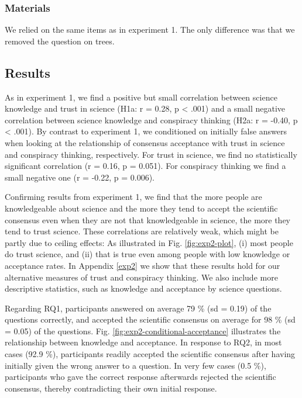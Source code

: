 \documentclass[
  doc,floatsintext]{apa6}
\begin{document}
\subsubsection{Materials}\label{materials-1}

We relied on the same items as in experiment 1. The only difference was that we removed the question on trees.

\subsection{Results}\label{results-1}

As in experiment 1, we find a positive but small correlation between science knowledge and trust in science (H1a: r = 0.28, p \textless{} .001) and a small negative correlation between science knowledge and conspiracy thinking (H2a: r = -0.40, p \textless{} .001). By contrast to experiment 1, we conditioned on initially false answers when looking at the relationship of consensus acceptance with trust in science and conspiracy thinking, respectively. For trust in science, we find no statistically significant correlation (r = 0.16, p = 0.051). For conspiracy thinking we find a small negative one (r = -0.22, p = 0.006).

Confirming results from experiment 1, we find that the more people are knowledgeable about science and the more they tend to accept the scientific consensus even when they are not that knowledgeable in science, the more they tend to trust science. These correlations are relatively weak, which might be partly due to ceiling effects: As illustrated in Fig. \ref{fig:exp2-plot}, (i) most people do trust science, and (ii) that is true even among people with low knowledge or acceptance rates. In Appendix \ref{exp2} we show that these results hold for our alternative measures of trust and conspiracy thinking. We also include more descriptive statistics, such as knowledge and acceptance by science questions.

Regarding RQ1, participants answered on average 79 \% (sd = 0.19) of the questions correctly, and accepted the scientific consensus on average for 98 \% (sd = 0.05) of the questions. Fig. \ref{fig:exp2-conditional-acceptance} illustrates the relationship between knowledge and acceptance. In response to RQ2, in most cases (92.9 \%), participants readily accepted the scientific consensus after having initially given the wrong answer to a question. In very few cases (0.5 \%), participants who gave the correct response afterwards rejected the scientific consensus, thereby contradicting their own initial response.
\end{document}
